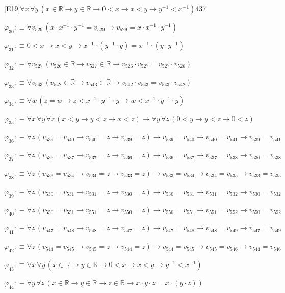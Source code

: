 \begin{fullproof}{[E19]}{$\forall x\,\forall y\,(x \in \mathbb{R} \to y \in \mathbb{R} \to 0 < x \to x < y \to y^{-1} < x^{-1})$}{437}
\begin{abbrevlist}
\item $\varphi_{30} :\equiv \forall v_{529}\,(x \cdot x^{-1} \cdot y^{-1} = v_{529} \to v_{529} = x \cdot x^{-1} \cdot y^{-1})$
\item $\varphi_{31} :\equiv 0 < x \to x < y \to x^{-1} \cdot (y^{-1} \cdot y) = x^{-1} \cdot (y \cdot y^{-1})$
\item $\varphi_{32} :\equiv \forall v_{527}\,(v_{526} \in \mathbb{R} \to v_{527} \in \mathbb{R} \to v_{526} \cdot v_{527} = v_{527} \cdot v_{526})$
\item $\varphi_{33} :\equiv \forall v_{543}\,(v_{542} \in \mathbb{R} \to v_{543} \in \mathbb{R} \to v_{542} \cdot v_{543} = v_{543} \cdot v_{542})$
\item $\varphi_{34} :\equiv \forall w\,(z = w \to z < x^{-1} \cdot y^{-1} \cdot y \to w < x^{-1} \cdot y^{-1} \cdot y)$
\item $\varphi_{35} :\equiv \forall x\,\forall y\,\forall z\,(x < y \to y < z \to x < z) \to \forall y\,\forall z\,(0 < y \to y < z \to 0 < z)$
\item $\varphi_{36} :\equiv \forall z\,(v_{539} = v_{540} \to v_{540} = z \to v_{539} = z) \to v_{539} = v_{540} \to v_{540} = v_{541} \to v_{539} = v_{541}$
\item $\varphi_{37} :\equiv \forall z\,(v_{536} = v_{537} \to v_{537} = z \to v_{536} = z) \to v_{536} = v_{537} \to v_{537} = v_{538} \to v_{536} = v_{538}$
\item $\varphi_{38} :\equiv \forall z\,(v_{533} = v_{534} \to v_{534} = z \to v_{533} = z) \to v_{533} = v_{534} \to v_{534} = v_{535} \to v_{533} = v_{535}$
\item $\varphi_{39} :\equiv \forall z\,(v_{530} = v_{531} \to v_{531} = z \to v_{530} = z) \to v_{530} = v_{531} \to v_{531} = v_{532} \to v_{530} = v_{532}$
\item $\varphi_{40} :\equiv \forall z\,(v_{550} = v_{551} \to v_{551} = z \to v_{550} = z) \to v_{550} = v_{551} \to v_{551} = v_{552} \to v_{550} = v_{552}$
\item $\varphi_{41} :\equiv \forall z\,(v_{547} = v_{548} \to v_{548} = z \to v_{547} = z) \to v_{547} = v_{548} \to v_{548} = v_{549} \to v_{547} = v_{549}$
\item $\varphi_{42} :\equiv \forall z\,(v_{544} = v_{545} \to v_{545} = z \to v_{544} = z) \to v_{544} = v_{545} \to v_{545} = v_{546} \to v_{544} = v_{546}$
\item $\varphi_{43} :\equiv \forall x\,\forall y\,(x \in \mathbb{R} \to y \in \mathbb{R} \to 0 < x \to x < y \to y^{-1} < x^{-1})$
\item $\varphi_{44} :\equiv \forall y\,\forall z\,(x \in \mathbb{R} \to y \in \mathbb{R} \to z \in \mathbb{R} \to x \cdot y \cdot z = x \cdot (y \cdot z))$

\end{abbrevlist}
\end{fullproof}
